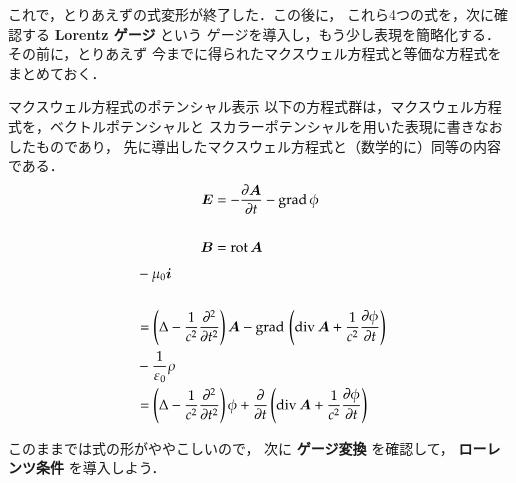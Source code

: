             これで，とりあえずの式変形が終了した．この後に，
            これら4つの式を，次に確認する \textbf{Lorentz ゲージ} という
            ゲージを導入し，もう少し表現を簡略化する．その前に，とりあえず
            今までに得られたマクスウェル方程式と等価な方程式をまとめておく．
                    \begin{myshadebox}{マクスウェル方程式のポテンシャル表示}
                        以下の方程式群は，マクスウェル方程式を，ベクトルポテンシャルと
                        スカラーポテンシャルを用いた表現に書きなおしたものであり，
                        先に導出したマクスウェル方程式と（数学的に）同等の内容である．
                        \begin{align}
                            \bE&=-\displaystyle
                            \frac{\rd\bA}{\rd t}-\mathrm{grad\,}\phi \\ \notag \\
                            \vspace{2mm}
                            \bB&=\mathrm{rot\,}\bA
                        \end{align}
                        \begin{align}
                            &-\mu_{0}\bi  \\\,\vspace{2mm}  \notag \\
                            &=\left(\Delta
                            -\frac{1}{c^{2}}\frac{\rd^{2}}{\rd t^{2}}\right)\bA
                            -\mathrm{grad\,}\left( \mathrm{div\,}\bA
                            +\frac{1}{c^{2}}\frac{\rd{\phi}}{\rd t}\right) \\
                            &-\frac{1}{\varepsilon_{0}}\rho \notag \\
                            &=\left(\Delta
                            -\frac{1}{c^{2}}\frac{\rd^{2} }{\rd t^{2}}\right)\phi
                            +\frac{\rd}{\rd t}\left(\mathrm{div\,}\bA
                            +\frac{1}{c^{2}}\frac{\rd \phi}{\rd t}
                            \right)
                        \end{align}
                    \end{myshadebox}

                このままでは式の形がややこしいので，
                次に \textbf{ゲージ変換} を確認して，
                \textbf{ローレンツ条件} を導入しよう．


